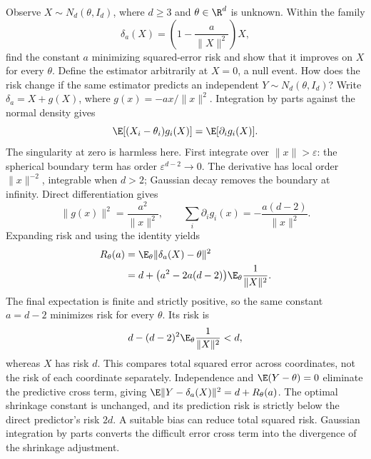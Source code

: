 Observe $X\sim N_d(\theta,I_d)$, where $d\ge3$ and $\theta\in\R^d$ is unknown. Within the family
\[
 \delta_a(X)=\left(1-\frac a{\|X\|^2}\right)X,
\]
find the constant $a$ minimizing squared-error risk and show that it improves on $X$ for every $\theta$. Define the estimator arbitrarily at $X=0$, a null event. How does the risk change if the same estimator predicts an independent $Y\sim N_d(\theta,I_d)$?
\solution Write $\delta_a=X+g(X)$, where $g(x)=-ax/\|x\|^2$. Integration by parts against the normal density gives
\[
 \E[(X_i-\theta_i)g_i(X)]=\E[\partial_i g_i(X)].
\]
The singularity at zero is harmless here. First integrate over $\|x\|>\varepsilon$: the spherical boundary term has order $\varepsilon^{d-2}\to0$. The derivative has local order $\|x\|^{-2}$, integrable when $d>2$; Gaussian decay removes the boundary at infinity.
Direct differentiation gives
\[
 \|g(x)\|^2=\frac{a^2}{\|x\|^2},\qquad
 \sum_i\partial_i g_i(x)=-\frac{a(d-2)}{\|x\|^2}.
\]
Expanding risk and using the identity yields
\[
 \begin{aligned}
 R_\theta(a)&=\E_\theta\|\delta_a(X)-\theta\|^2\\
 &=d+\bigl(a^2-2a(d-2)\bigr)
                 \E_\theta\frac1{\|X\|^2}.
 \end{aligned}
\]
The final expectation is finite and strictly positive, so the same constant $a=d-2$ minimizes risk for every $\theta$. Its risk is
\[
 d-(d-2)^2\E_\theta\frac1{\|X\|^2}<d,
\]
whereas $X$ has risk $d$. This compares total squared error across coordinates, not the risk of each coordinate separately.
Independence and $\E(Y-\theta)=0$ eliminate the predictive cross term, giving $\E\|Y-\delta_a(X)\|^2=d+R_\theta(a)$. The optimal shrinkage constant is unchanged, and its prediction risk is strictly below the direct predictor's risk $2d$.
\insight A suitable bias can reduce total squared risk. Gaussian integration by parts converts the difficult error cross term into the divergence of the shrinkage adjustment.

